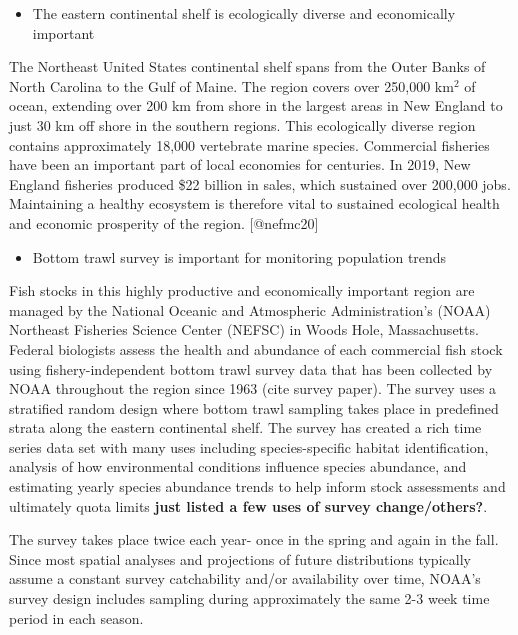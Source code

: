 \documentclass[
  12pt,
]{article}
\providecommand{\tightlist}{%
  \setlength{\itemsep}{0pt}\setlength{\parskip}{0pt}}
\begin{document}
\begin{itemize}
\tightlist
\item
  The eastern continental shelf is ecologically diverse and economically important
\end{itemize}

The Northeast United States continental shelf spans from the Outer Banks of North Carolina to the Gulf of Maine. The region covers over 250,000 km\(^2\) of ocean, extending over 200 km from shore in the largest areas in New England to just 30 km off shore in the southern regions. This ecologically diverse region contains approximately 18,000 vertebrate marine species. Commercial fisheries have been an important part of local economies for centuries. In 2019, New England fisheries produced \$22 billion in sales, which sustained over 200,000 jobs. Maintaining a healthy ecosystem is therefore vital to sustained ecological health and economic prosperity of the region. {[}@nefmc20{]}

\begin{itemize}
\tightlist
\item
  Bottom trawl survey is important for monitoring population trends
\end{itemize}

Fish stocks in this highly productive and economically important region are managed by the National Oceanic and Atmospheric Administration's (NOAA) Northeast Fisheries Science Center (NEFSC) in Woods Hole, Massachusetts. Federal biologists assess the health and abundance of each commercial fish stock using fishery-independent bottom trawl survey data that has been collected by NOAA throughout the region since 1963 (cite survey paper). The survey uses a stratified random design where bottom trawl sampling takes place in predefined strata along the eastern continental shelf. The survey has created a rich time series data set with many uses including species-specific habitat identification, analysis of how environmental conditions influence species abundance, and estimating yearly species abundance trends to help inform stock assessments and ultimately quota limits \textbf{just listed a few uses of survey change/others?}.

The survey takes place twice each year- once in the spring and again in the fall. Since most spatial analyses and projections of future distributions typically assume a constant survey catchability and/or availability over time, NOAA's survey design includes sampling during approximately the same 2-3 week time period in each season.
\end{document}
